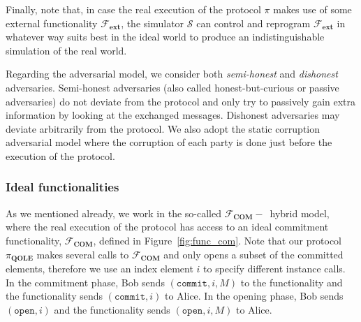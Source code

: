 Finally, note that, in case the real execution of the protocol $\mathcal{\pi}$ makes use of some external functionality $\mathcal{F}_{\textbf{ext}}$, the simulator $\mathcal{S}$ can control and reprogram $\mathcal{F}_{\textbf{ext}}$ in whatever way suits best in the ideal world to produce an indistinguishable simulation of the real world.




 
Regarding the adversarial model, we consider both \textit{semi-honest} and \textit{dishonest} adversaries. Semi-honest adversaries (also called honest-but-curious or passive adversaries) do not deviate from the protocol and only try to passively gain extra information by looking at the exchanged messages. Dishonest adversaries may deviate arbitrarily from the protocol. We also adopt the static corruption adversarial model where the corruption of each party is done just before the execution of the protocol.


\subsubsection{Ideal functionalities}\label{functinalities}

As we mentioned already, we work in the so-called $\mathcal{F}_{\textbf{COM}}-$~hybrid model, where the real execution of the protocol has access to an ideal commitment functionality, $\mathcal{F}_{\textbf{COM}}$, defined in Figure~\ref{fig:func_com}. Note that our protocol $\mathcal{\pi}_{\textbf{QOLE}}$ makes several calls to $\mathcal{F}_{\textbf{COM}}$ and only opens a subset of the committed elements, therefore we use an index element $i$ to specify different instance calls. In the commitment phase, Bob sends $(\texttt{commit}, i, M)$ to the functionality and the functionality sends $(\texttt{commit}, i)$ to Alice. In the opening phase, Bob sends $(\texttt{open}, i)$ and the functionality sends $(\texttt{open}, i, M)$ to Alice.

